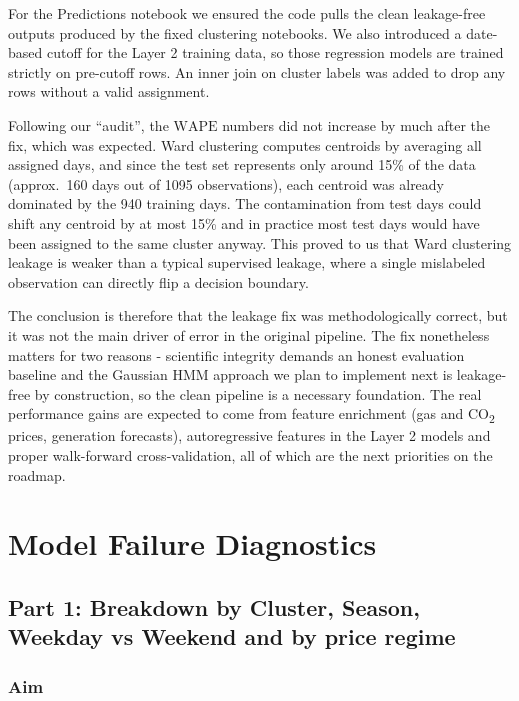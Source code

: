 \documentclass[12pt, a4paper]{article}
\newcommand{\WAPE}{\text{WAPE}}
\begin{document}
For the Predictions notebook we ensured the code pulls the clean leakage-free
outputs produced by the fixed clustering notebooks. We also introduced a
date-based cutoff for the Layer 2 training data, so those regression models are
trained strictly on pre-cutoff rows. An inner join on cluster labels was added to
drop any rows without a valid assignment.

Following our ``audit'', the $\WAPE$ numbers did not increase by much after the
fix, which was expected. Ward clustering computes centroids by averaging all
assigned days, and since the test set represents only around 15\% of the data
(approx.\ 160 days out of 1095 observations), each centroid was already dominated
by the 940 training days. The contamination from test days could shift any
centroid by at most 15\% and in practice most test days would have been assigned
to the same cluster anyway. This proved to us that Ward clustering leakage is
weaker than a typical supervised leakage, where a single mislabeled observation
can directly flip a decision boundary.

The conclusion is therefore that the leakage fix was methodologically correct,
but it was not the main driver of error in the original pipeline. The fix
nonetheless matters for two reasons - scientific integrity demands an honest
evaluation baseline and the Gaussian HMM approach we plan to implement next is
leakage-free by construction, so the clean pipeline is a necessary foundation.
The real performance gains are expected to come from feature enrichment (gas and
CO\textsubscript{2} prices, generation forecasts), autoregressive features in the
Layer 2 models and proper walk-forward cross-validation, all of which are the
next priorities on the roadmap.

\section{Model Failure Diagnostics}

\subsection{Part 1: Breakdown by Cluster, Season, Weekday vs Weekend and by
price regime}

\subsubsection{Aim}
\end{document}
